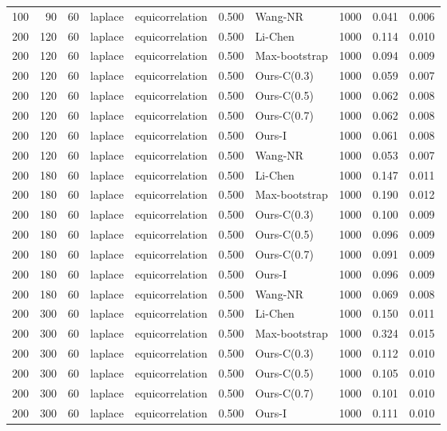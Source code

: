 \begin{tabular}{rrrllrlrrr}
100 & 90 & 60 & laplace & equicorrelation & 0.500 & Wang-NR & 1000 & 0.041 & 0.006 \\
200 & 120 & 60 & laplace & equicorrelation & 0.500 & Li-Chen & 1000 & 0.114 & 0.010 \\
200 & 120 & 60 & laplace & equicorrelation & 0.500 & Max-bootstrap & 1000 & 0.094 & 0.009 \\
200 & 120 & 60 & laplace & equicorrelation & 0.500 & Ours-C(0.3) & 1000 & 0.059 & 0.007 \\
200 & 120 & 60 & laplace & equicorrelation & 0.500 & Ours-C(0.5) & 1000 & 0.062 & 0.008 \\
200 & 120 & 60 & laplace & equicorrelation & 0.500 & Ours-C(0.7) & 1000 & 0.062 & 0.008 \\
200 & 120 & 60 & laplace & equicorrelation & 0.500 & Ours-I & 1000 & 0.061 & 0.008 \\
200 & 120 & 60 & laplace & equicorrelation & 0.500 & Wang-NR & 1000 & 0.053 & 0.007 \\
200 & 180 & 60 & laplace & equicorrelation & 0.500 & Li-Chen & 1000 & 0.147 & 0.011 \\
200 & 180 & 60 & laplace & equicorrelation & 0.500 & Max-bootstrap & 1000 & 0.190 & 0.012 \\
200 & 180 & 60 & laplace & equicorrelation & 0.500 & Ours-C(0.3) & 1000 & 0.100 & 0.009 \\
200 & 180 & 60 & laplace & equicorrelation & 0.500 & Ours-C(0.5) & 1000 & 0.096 & 0.009 \\
200 & 180 & 60 & laplace & equicorrelation & 0.500 & Ours-C(0.7) & 1000 & 0.091 & 0.009 \\
200 & 180 & 60 & laplace & equicorrelation & 0.500 & Ours-I & 1000 & 0.096 & 0.009 \\
200 & 180 & 60 & laplace & equicorrelation & 0.500 & Wang-NR & 1000 & 0.069 & 0.008 \\
200 & 300 & 60 & laplace & equicorrelation & 0.500 & Li-Chen & 1000 & 0.150 & 0.011 \\
200 & 300 & 60 & laplace & equicorrelation & 0.500 & Max-bootstrap & 1000 & 0.324 & 0.015 \\
200 & 300 & 60 & laplace & equicorrelation & 0.500 & Ours-C(0.3) & 1000 & 0.112 & 0.010 \\
200 & 300 & 60 & laplace & equicorrelation & 0.500 & Ours-C(0.5) & 1000 & 0.105 & 0.010 \\
200 & 300 & 60 & laplace & equicorrelation & 0.500 & Ours-C(0.7) & 1000 & 0.101 & 0.010 \\
200 & 300 & 60 & laplace & equicorrelation & 0.500 & Ours-I & 1000 & 0.111 & 0.010 \\

\end{tabular}
